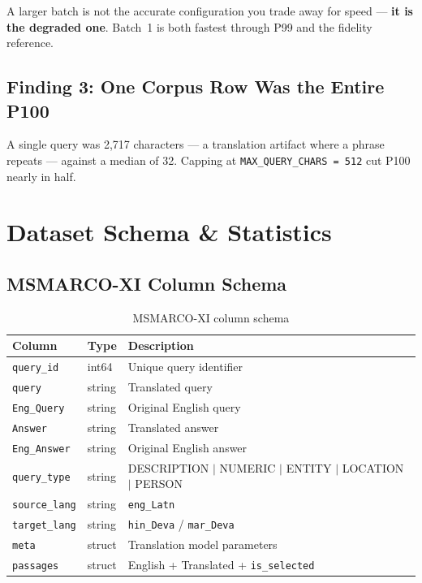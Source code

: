 \documentclass[12pt,a4paper]{article}
\begin{document}
A larger batch is not the accurate configuration you trade away for speed --- \textbf{it is the degraded one}. Batch~1 is both fastest through P99 and the fidelity reference.

\subsection{Finding 3: One Corpus Row Was the Entire P100}

A single query was 2,717 characters --- a translation artifact where a phrase repeats --- against a median of 32. Capping at \texttt{MAX\_QUERY\_CHARS = 512} cut P100 nearly in half.


\section{Dataset Schema \& Statistics}

\subsection{MSMARCO-XI Column Schema}

\begin{table}[H]
\centering
\begin{tabular}{lll}
\toprule
\textbf{Column} & \textbf{Type} & \textbf{Description} \\
\midrule
\texttt{query\_id}    & int64  & Unique query identifier \\
\texttt{query}        & string & Translated query \\
\texttt{Eng\_Query}   & string & Original English query \\
\texttt{Answer}       & string & Translated answer \\
\texttt{Eng\_Answer}  & string & Original English answer \\
\texttt{query\_type}  & string & DESCRIPTION $|$ NUMERIC $|$ ENTITY $|$ LOCATION $|$ PERSON \\
\texttt{source\_lang} & string & \texttt{eng\_Latn} \\
\texttt{target\_lang} & string & \texttt{hin\_Deva} / \texttt{mar\_Deva} \\
\texttt{meta}         & struct & Translation model parameters \\
\texttt{passages}     & struct & English + Translated + \texttt{is\_selected} \\
\bottomrule
\end{tabular}
\caption{MSMARCO-XI column schema}
\end{table}
\end{document}
